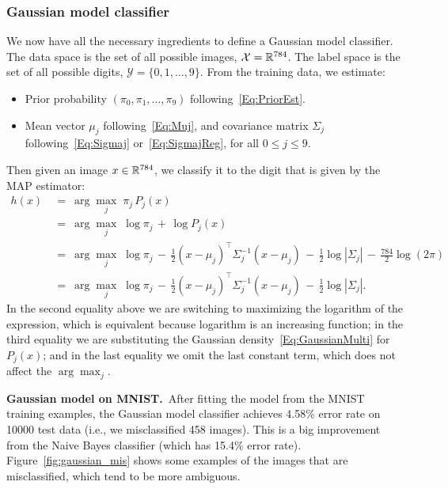 \documentclass[11pt]{article}
\newcounter{thm}
\def\X{\mathcal{X}}
\def\Y{\mathcal{Y}}
\begin{document}
\subsubsection*{Gaussian model classifier}

We now have all the necessary ingredients to define a Gaussian model classifier. The data space is the set of all possible images, $\X = \R^{784}$. The label space is the set of all possible digits, $\Y = \{0,1,\dots,9\}$. From the training data, we estimate:
\begin{itemize}
  \item Prior probability $(\pi_0, \pi_1, \dots, \pi_9)$ following~\eqref{Eq:PriorEst}.
  \item Mean vector $\mu_j$ following~\eqref{Eq:Muj}, and covariance matrix $\Sigma_j$ following~\eqref{Eq:Sigmaj} or~\eqref{Eq:SigmajReg}, for all $0 \le j \le 9$.
\end{itemize}
Then given an image $x \in \mathbb{R}^{784}$, we classify it to the digit that is given by the MAP estimator:
\begin{align*}
h(x) ~&=~ \arg\max_j \; \pi_j \, P_j(x) \\
&=~ \arg\max_j \; \log \pi_j \,+\, \log P_j(x) \\
&=~ \arg\max_j \; \log \pi_j \,-\, \frac{1}{2} (x - \mu_j)^\top \Sigma_j^{-1} (x-\mu_j)  \,-\, \frac{1}{2} \log |\Sigma_j| \,-\, \frac{784}{2} \log(2\pi) \\
&=~ \arg\max_j \; \log \pi_j \,-\, \frac{1}{2} (x - \mu_j)^\top \Sigma_j^{-1} (x-\mu_j)  \,-\, \frac{1}{2} \log |\Sigma_j|.
\end{align*}
In the second equality above we are switching to maximizing the logarithm of the expression, which is equivalent because logarithm is an increasing function; in the third equality we are substituting the Gaussian density~\eqref{Eq:GaussianMulti} for $P_j(x)$; and in the last equality we omit the last constant term, which does not affect the $\arg\max_j$.

\medskip
{\bf Gaussian model on MNIST.}~After fitting the model from the MNIST training examples, the Gaussian model classifier achieves 4.58\% error rate on 10000 test data (i.e., we misclassified 458 images). This is a big improvement from the Naive Bayes classifier (which has 15.4\% error rate). Figure~\ref{fig:gaussian_mis} shows some examples of the images that are misclassified, which tend to be more ambiguous.
\end{document}
